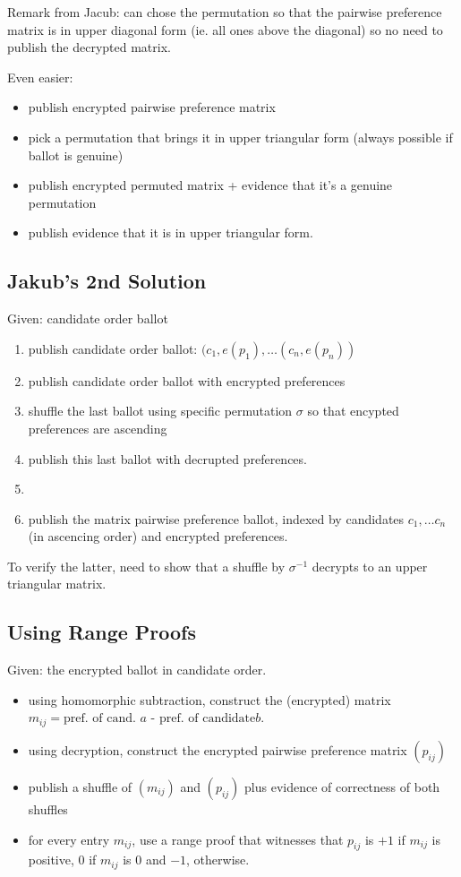 \documentclass{llncs}
\begin{document}
Remark from Jacub: can chose the permutation so that the pairwise
preference matrix is in upper diagonal form (ie. all ones above the
diagonal) so no need to publish the decrypted matrix. 

Even easier:
\begin{itemize}
\item publish encrypted pairwise preference matrix
\item pick a permutation that brings it in upper triangular form
(always possible if ballot is genuine)
\item publish encrypted permuted matrix + evidence that it's a
genuine permutation
\item publish evidence that it is in upper triangular form.
\end{itemize}

\subsection{Jakub's 2nd Solution}

Given: candidate order ballot
\begin{enumerate}
\item publish candidate order ballot: $(c_1, e(p_1), \dots (c_n,
e(p_n))$
\item publish candidate order ballot with encrypted preferences
\item shuffle the last ballot using specific permutation $\sigma$ so that encypted preferences are
ascending
\item publish this last ballot with decrupted preferences.
\item []
\item publish the matrix pairwise preference ballot, indexed by
  candidates $c_1, \dots c_n$ (in ascencing order) and encrypted
  preferences.
\end{enumerate}

To verify the latter, need to show that a shuffle by $\sigma^{-1}$
decrypts to an upper triangular matrix.

\subsection{Using Range Proofs}

Given: the encrypted ballot in candidate order.

\begin{itemize}
\item using homomorphic subtraction, construct the (encrypted)
matrix $m_{ij} = \mbox{pref. of cand. $a$ - pref. of candidate
$b$}$.
\item using decryption, construct the encrypted pairwise preference
matrix $(p_{ij})$
\item publish a shuffle of $(m_{ij})$ and $(p_{ij})$ plus evidence of correctness
of both shuffles
\item for every entry $m_{ij}$, use a range proof that witnesses
that $p_{ij}$ is $+1$ if $m_{ij}$ is positive, $0$ if $m_{ij}$ is
$0$ and $-1$, otherwise.
\end{itemize}
\end{document}
